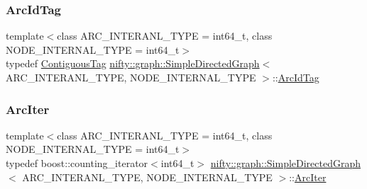 \subsubsection{\texorpdfstring{Arc\+Id\+Tag}{ArcIdTag}}
{\footnotesize\ttfamily template$<$class A\+R\+C\+\_\+\+I\+N\+T\+E\+R\+A\+N\+L\+\_\+\+T\+Y\+PE  = int64\+\_\+t, class N\+O\+D\+E\+\_\+\+I\+N\+T\+E\+R\+N\+A\+L\+\_\+\+T\+Y\+PE  = int64\+\_\+t$>$ \\
typedef \hyperlink{structnifty_1_1graph_1_1ContiguousTag}{Contiguous\+Tag} \hyperlink{classnifty_1_1graph_1_1SimpleDirectedGraph}{nifty\+::graph\+::\+Simple\+Directed\+Graph}$<$ A\+R\+C\+\_\+\+I\+N\+T\+E\+R\+A\+N\+L\+\_\+\+T\+Y\+PE, N\+O\+D\+E\+\_\+\+I\+N\+T\+E\+R\+N\+A\+L\+\_\+\+T\+Y\+PE $>$\+::\hyperlink{classnifty_1_1graph_1_1SimpleDirectedGraph_a0e61985b1487d018ab09fcefb2302c99}{Arc\+Id\+Tag}}

\mbox{\label{classnifty_1_1graph_1_1SimpleDirectedGraph_ad555ff3a9746915c60858cd7d55ae342}} 
\subsubsection{\texorpdfstring{Arc\+Iter}{ArcIter}}
{\footnotesize\ttfamily template$<$class A\+R\+C\+\_\+\+I\+N\+T\+E\+R\+A\+N\+L\+\_\+\+T\+Y\+PE  = int64\+\_\+t, class N\+O\+D\+E\+\_\+\+I\+N\+T\+E\+R\+N\+A\+L\+\_\+\+T\+Y\+PE  = int64\+\_\+t$>$ \\
typedef boost\+::counting\+\_\+iterator$<$int64\+\_\+t$>$ \hyperlink{classnifty_1_1graph_1_1SimpleDirectedGraph}{nifty\+::graph\+::\+Simple\+Directed\+Graph}$<$ A\+R\+C\+\_\+\+I\+N\+T\+E\+R\+A\+N\+L\+\_\+\+T\+Y\+PE, N\+O\+D\+E\+\_\+\+I\+N\+T\+E\+R\+N\+A\+L\+\_\+\+T\+Y\+PE $>$\+::\hyperlink{classnifty_1_1graph_1_1SimpleDirectedGraph_ad555ff3a9746915c60858cd7d55ae342}{Arc\+Iter}}

\mbox{\label{classnifty_1_1graph_1_1SimpleDirectedGraph_ad0523e96e29a6feae5c9c003c2dc9e37}} 
